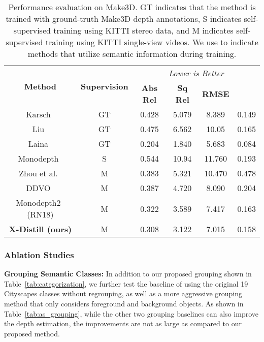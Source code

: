\documentclass{bmvc2k}
\newcommand{\rev}{}
\begin{document}
\begin{table}[h!]
\vspace{-7pt}
\centering
\scriptsize
\begin{tabular}[h]{ c | c | c  c  c  c}
\hline
\multirow{2}{*}{\textbf{Method}} & \multirow{2}{*}{\textbf{Supervision}}  &\multicolumn{4}{c}{\it Lower is Better} \\ &
& {\bf Abs Rel} &{\bf Sq Rel} &{\bf RMSE} &{\bf }\\
\hline

Karsch~\cite{karsch2014depth} &GT &0.428 &5.079 &8.389 &0.149\\
Liu~\cite{liu2014discrete} &GT &0.475 &6.562 &10.05 &0.165\\
Laina~\cite{laina2016deeper} &GT &0.204 &1.840 &5.683 &0.084\\
\hline

Monodepth~\cite{godard2017unsupervised} &S &0.544 &10.94 &11.760 &0.193\\
Zhou et al.~\cite{zhou2017unsupervised} &M &0.383 &5.321 &10.470 &0.478\\
DDVO~\cite{wang2018learning} &M &0.387 &4.720 &8.090 &0.204\\
Monodepth2~\cite{godard2019digging} (RN18) &M &0.322 &3.589 &7.417 &0.163 \\

\hdashline
\textbf{X-Distill (ours)} &M &0.308 &3.122 &7.015 &0.158 \\
\hline
\end{tabular}
\vspace{5pt}
\caption{\small Performance evaluation on Make3D. GT indicates that the method is trained with ground-truth Make3D depth annotations, S indicates self-supervised training using KITTI stereo data, and M indicates self-supervised training using KITTI single-view videos. \rev{We use  to indicate methods that utilize semantic information during training.}}
\label{tab:results_make3d}
\vspace{-10pt}
\end{table}

\vspace{-7pt}
\subsubsection{Ablation Studies}
\vspace{-5pt}

\noindent \textbf{Grouping Semantic Classes:} In addition to our proposed grouping shown in Table~\ref{tab:categorization}, we further test the baseline of using the original 19 Cityscapes classes without regrouping, as well as a more aggressive grouping method that only considers foreground and background objects. As shown in Table~\ref{tab:as_grouping}, while the other two grouping baselines can also improve the depth estimation, the improvements are not as large as compared to our proposed method. 
\end{document}
